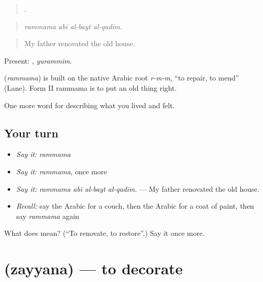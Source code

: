\begin{quote}
   .
\end{quote}

\begin{quote}
\emph{rammama abī al-bayt al-qadīm.}
\end{quote}

\begin{quote}
My father renovated the old house.
\end{quote}

Present: , \emph{yurammim}.

\begin{cousinweb}
\textbf{} (\emph{rammama}) is built on the native Arabic root \emph{r-m-m}, \textquotedblleft{}to repair, to mend\textquotedblright{} (Lane). Form II rammama is to put an old thing right.
\end{cousinweb}

\begin{grammarlens}[title={What you've built}]
One more word for describing what you lived and felt.
\end{grammarlens}

\subsection*{Your turn}
\begin{itemize}
\raggedright
  \item \emph{Say it:} \emph{rammama}
  \item \emph{Say it:} \emph{rammama}, once more
  \item \emph{Say it:} \emph{rammama abī al-bayt al-qadīm.} — My father renovated the old house.
  \item \emph{Recall:} say the Arabic for a couch, then the Arabic for a coat of paint, then say \emph{rammama} again
\end{itemize}

\begin{tcolorbox}[breakable,colback=teal!4,colframe=teal!35!black,title={Before you move on}]
What does  mean? (\textquotedblleft{}To renovate, to restore\textquotedblright{}.) Say it once more.
\end{tcolorbox}
\section[\texorpdfstring{\ar{زين} (zayyana)}{زين (zayyana)}]{ (zayyana) — to decorate}

